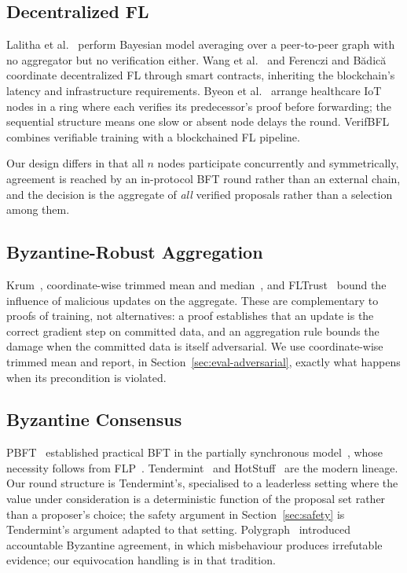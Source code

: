 \documentclass{llncs}
\begin{document}
\subsection{Decentralized FL}

Lalitha et al.~\cite{lalitha2019p2pfl} perform Bayesian model averaging over a
peer-to-peer graph with no aggregator but no verification either. Wang et
al.~\cite{wang2023enhancing} and Ferenczi and B\u{a}dic\u{a}~\cite{ferenczi2024decentralized}
coordinate decentralized FL through smart contracts, inheriting the blockchain's
latency and infrastructure requirements. Byeon et al.~\cite{byeon2025trusted}
arrange healthcare IoT nodes in a ring where each verifies its predecessor's
proof before forwarding; the sequential structure means one slow or absent node
delays the round. VerifBFL~\cite{bellachia2025verifbfl} combines verifiable
training with a blockchained FL pipeline.

Our design differs in that all $n$ nodes participate concurrently and
symmetrically, agreement is reached by an in-protocol BFT round rather than an
external chain, and the decision is the aggregate of \emph{all} verified
proposals rather than a selection among them.

\subsection{Byzantine-Robust Aggregation}

Krum~\cite{blanchard2017krum}, coordinate-wise trimmed mean and
median~\cite{yin2018trimmedmean}, and FLTrust~\cite{cao2021fltrust} bound the
influence of malicious updates on the aggregate. These are complementary to
proofs of training, not alternatives: a proof establishes that an update is the
correct gradient step on committed data, and an aggregation rule bounds the
damage when the committed data is itself adversarial. We use coordinate-wise
trimmed mean and report, in Section~\ref{sec:eval-adversarial}, exactly what
happens when its precondition is violated.

\subsection{Byzantine Consensus}

PBFT~\cite{castro1999pbft} established practical BFT in the partially
synchronous model~\cite{dwork1988partialsynchrony}, whose necessity follows from
FLP~\cite{fischer1985flp}. Tendermint~\cite{buchman2018tendermint} and
HotStuff~\cite{yin2019hotstuff} are the modern lineage. Our round structure is
Tendermint's, specialised to a leaderless setting where the value under
consideration is a deterministic function of the proposal set rather than a
proposer's choice; the safety argument in Section~\ref{sec:safety} is
Tendermint's argument adapted to that setting. Polygraph~\cite{civit2021polygraph}
introduced accountable Byzantine agreement, in which misbehaviour produces
irrefutable evidence; our equivocation handling is in that tradition.
\end{document}
